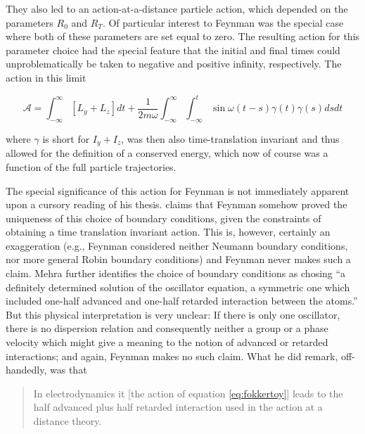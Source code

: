 \documentclass[12pt]{article}
\begin{document}
They also led to an action-at-a-distance particle action, which depended on the parameters $R_0$ and $R_T$. Of particular interest to Feynman was the special case where both of these parameters are set equal to zero. The resulting action for this parameter choice had the special feature that the initial and final times could unproblematically be taken to negative and positive infinity, respectively. The action in this limit 

\begin{equation}
\label{eq:fokkertoy}
\mathcal{A} = \int_{-\infty}^{\infty} \left[ L_y + L_z \right] dt + \frac{1}{2 m \omega} \int_{-\infty}^{\infty} \int_{-\infty}^{t} \sin{\omega (t-s)} \gamma(t) \gamma (s) ds dt
\end{equation}

where $\gamma$ is short for $I_y + I_z$, was then also  time-translation invariant and thus allowed for the definition of a conserved energy, which now of course was a function of the full particle trajectories. 

The special significance of this action for Feynman is not immediately apparent upon a cursory reading of his thesis. \citep[p. 133]{mehra_1994_the-beat} claims that Feynman somehow proved the uniqueness of this choice of boundary conditions, given the constraints of obtaining a time translation invariant action. This is, however, certainly an exaggeration (e.g., Feynman considered neither Neumann boundary conditions, nor more general Robin boundary conditions) and Feynman never makes such a claim. Mehra further identifies the choice of boundary conditions as chosing ``a definitely determined solution of the oscillator equation, a symmetric one which included one-half advanced and one-half retarded interaction between the atoms.'' But this physical interpretation is very unclear: If there is only one oscillator, there is no dispersion relation and consequently neither a group or a phase velocity which might give a meaning to the notion of advanced or retarded interactions; and again, Feynman makes no such claim. What he did remark, off-handedly, was that

\begin{quote}
In electrodynamics it [the action of equation \ref{eq:fokkertoy}] leads to the half advanced plus half retarded interaction used in the action at a distance theory.
\end{quote}
\end{document}
